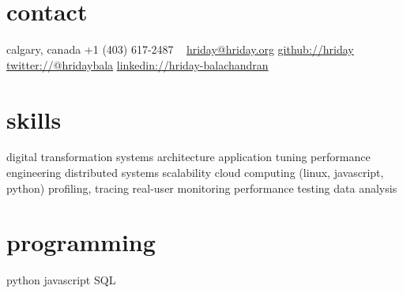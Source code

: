 \begin{aside}
    \section{contact}
        calgary, canada
        +1 (403) 617-2487
        ~
        \href{mailto:hriday@hriday.org}{hriday@hriday.org}
        \href{https://github.com/hriday}{github://hriday}
        \href{https://twitter.com/hridaybala}{twitter://@hridaybala}
        \href{https://www.linkedin.com/in/hriday-balachandran}{linkedin://hriday-balachandran}
    \section{skills}
        digital transformation
	systems architecture
        application tuning
        performance engineering
        distributed systems
        scalability
        cloud computing
        (linux, javascript, python)
        profiling, tracing
        real-user monitoring
        performance testing
        data analysis
        \section{programming}
        python
        javascript
	SQL
\end{aside}
